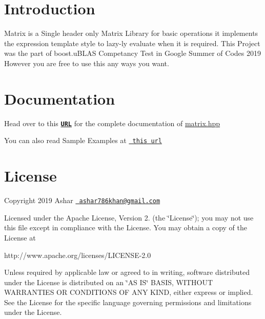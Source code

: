 \hypertarget{index_intro_sec}{}\section{Introduction}\label{index_intro_sec}
Matrix is a Single header only Matrix Library for basic operations it implements the expression template style to lazy-\/ly evaluate when it is required. This Project was the part of boost.\+u\+B\+L\+AS Competancy Test in Google Summer of Codes 2019 However you are free to use this any ways you want.\hypertarget{index_install_sec}{}\section{Documentation}\label{index_install_sec}
Head over to this \href{https://coder3101.github.io/gsoc19-boost-test/html/classboost_1_1test_1_1matrix.html}{\texttt{ {\bfseries{U\+RL}}}} for the complete documentation of {\ttfamily \mbox{\hyperlink{matrix_8hpp_source}{matrix.\+hpp}}}

You can also read Sample Examples at \href{https://github.com/coder3101/gsoc19-boost-test}{\texttt{ this url}}\hypertarget{index_license}{}\section{License}\label{index_license}
Copyright 2019 Ashar \href{mailto:ashar786khan@gmail.com}{\texttt{ ashar786khan@gmail.\+com}}

Licensed under the Apache License, Version 2. (the \char`\"{}\+License\char`\"{}); you may not use this file except in compliance with the License. You may obtain a copy of the License at \begin{DoxyVerb}http://www.apache.org/licenses/LICENSE-2.0
\end{DoxyVerb}


Unless required by applicable law or agreed to in writing, software distributed under the License is distributed on an \char`\"{}\+A\+S I\+S\char`\"{} B\+A\+S\+IS, W\+I\+T\+H\+O\+UT W\+A\+R\+R\+A\+N\+T\+I\+ES OR C\+O\+N\+D\+I\+T\+I\+O\+NS OF A\+NY K\+I\+ND, either express or implied. See the License for the specific language governing permissions and limitations under the License. 